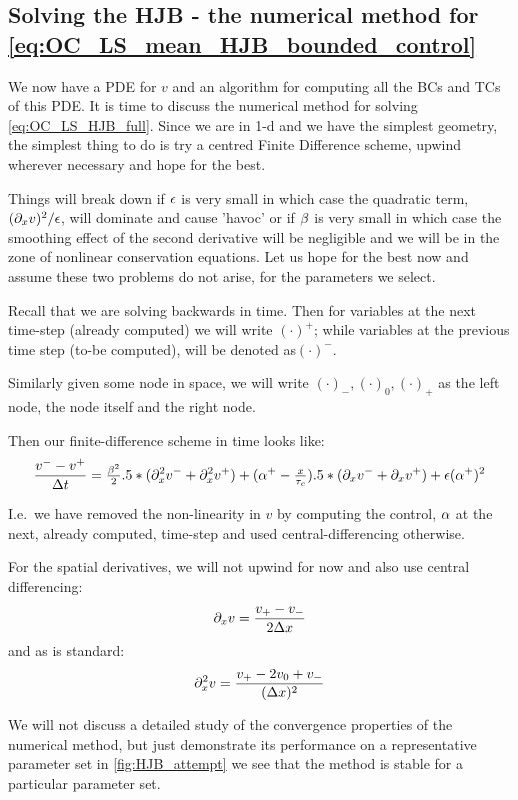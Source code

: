 \documentclass{article}
\begin{document}
\subsection{Solving the HJB - the numerical method for
\cref{eq:OC_LS_mean_HJB_bounded_control}}
We now have a PDE for $v$ and an algorithm for computing all the BCs and TCs of
this PDE. It is time to discuss the numerical method for solving
\cref{eq:OC_LS_HJB_full}.
Since we are in 1-d and we have the simplest geometry, the simplest thing to do
is try a centred Finite Difference scheme, upwind wherever necessary and hope
for the best. 

Things will break down if ${\epsilon}$ is very small in which case the quadratic term,
$({\partial}_x v)^2 / {\epsilon}$, will dominate and cause 'havoc' or if ${\beta}$ is very small in
which case the smoothing effect of the second derivative will be negligible and
we will be in the zone of nonlinear conservation equations. Let us hope for the
best now and assume these two problems do not arise, for the parameters we
select.

Recall that we are solving backwards in time. Then for variables at the next
time-step (already computed) we will write $(\cdot)^+$; while variables at the
previous time step (to-be computed), will be denoted as$(\cdot)^-$.

Similarly given some node in space, we will write
$(\cdot)_-,(\cdot)_0,(\cdot)_+$ as the left node, the node itself and the right
node.

Then our finite-difference scheme in time looks like:
\begin{equation}
\frac{v^- - v^+}{\Delta t} = \tfrac{{\beta}^2}2  .5*({\partial}_x^2 v^- + {\partial}_x^2 v^+) +
({\alpha}^+ - \tfrac{x}{{ \tau_{c} }})  .5*({\partial}_x v^- + {\partial}_x v^+) + {\epsilon} ({\alpha} ^+)^2
\end{equation}

I.e.\ we have removed the non-linearity in $v$ by computing the control, ${\alpha}$ at
the next, already computed, time-step and used central-differencing
otherwise. 

For the spatial derivatives, we will not upwind for now and also use central
differencing:
$${\partial}_x v = \frac{v_+ - v_-}{2\Delta x}$$
and as is standard:
$${\partial}^2_x v = \frac{v_+ - 2 v_0 + v_-}{(\Delta x)^2}$$

We will not discuss a detailed study of the convergence properties of the
numerical method, but just demonstrate its performance on a representative
parameter set in \cref{fig:HJB_attempt} we see that the method is stable for a
particular parameter set. 
\end{document}
